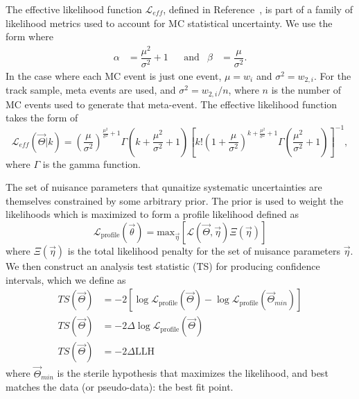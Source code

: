 \documentclass[main.tex]{subfiles}
\begin{document}
The effective likelihood function $\mathcal{L}_{eff}$, defined in Reference~\cite{effective_llh}, is part of a family of likelihood metrics used to account for MC statistical uncertainty. 
We use the form where
\begin{align}
    \alpha&=\dfrac{\mu^{2}}{\sigma^{2}} +1 & &\text{and} & \beta&=\dfrac{\mu}{\sigma^{2}}.
\end{align}
In the case where each MC event is just one event, $\mu = w_{i}$ and $\sigma^{2} = w_{2,i}$. For the track sample, meta events are used, and $\sigma^{2} = w_{2,i}/n$, where $n$ is the number of MC events used to generate that meta-event. The effective likelihood function takes the form of 
\begin{equation}
    \mathcal{L}_{eff}(\vec{\Theta} | k) = \left(\dfrac{\mu}{\sigma^{2}}\right)^{\tfrac{\mu^{2}}{\sigma^{2}} + 1} \Gamma\left(k + \dfrac{\mu^{2}}{\sigma^{2}} + 1\right) \left[ k! \left(1+\dfrac{\mu}{\sigma^{2}}\right)^{k+\tfrac{\mu^{2}}{\sigma^{2}} + 1} \Gamma\left(\dfrac{\mu^{2}}{\sigma^{2}} +1\right)\right]^{-1},
\end{equation}
where $\Gamma$ is the gamma function. 

The set of nuisance parameters that qunaitize systematic uncertainties are themselves constrained by some arbitrary prior. 
The prior is used to weight the likelihoods which is maximized to form a profile likelihood defined as 
\begin{equation}
\mathcal{L}_{\text{profile}}\left(\vec{\theta}\right) = \text{max}_{\vec{\eta}}\left[\mathcal{L}(\vec{\Theta}, \vec{\eta}) \Xi(\vec{\eta}) \right]
\end{equation}
where $\Xi(\vec{\eta})$ is the total likelihood penalty for the set of nuisance parameters $\vec{\eta}$. We then construct an analysis test statistic (TS) for producing confidence intervals, which we define as 
\begin{equation}\begin{split}
TS(\vec{\Theta}) &= -2\left[ \log\mathcal{L}_{\text{profile}}(\vec{\Theta}) - \log\mathcal{L}_{\text{profile}}(\vec{\Theta}_{min}) \right] \\
TS(\vec{\Theta}) &= -2 \Delta \log\mathcal{L}_{\text{profile}}(\vec{\Theta})\\
TS(\vec{\Theta}) &=-2\Delta \text{LLH}
\end{split}\end{equation}
where $\vec{\Theta}_{min}$ is the sterile hypothesis that maximizes the likelihood, and best matches the data (or pseudo-data): the best fit point. 
\end{document}

